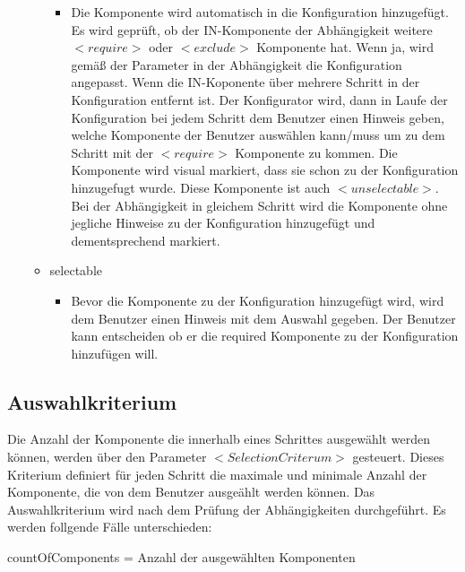 \documentclass{article}
\begin{document}
\begin{itemize}
\begin{itemize}
        \begin{itemize}
          \item Die Komponente wird automatisch in die Konfiguration hinzugef\"ugt.
          Es wird gepr\"uft, ob der IN-Komponente der Abh\"angigkeit weitere
          $<require>$ oder $<exclude>$ Komponente hat. Wenn ja, wird gem\"a\ss{} der
          Parameter in der Abh\"angigkeit die Konfiguration angepasst. Wenn die
          IN-Koponente über mehrere Schritt in der Konfiguration entfernt ist. Der
          Konfigurator wird, dann in Laufe der Konfiguration bei jedem Schritt dem
          Benutzer einen Hinweis geben, welche Komponente der Benutzer ausw\"ahlen
          kann/muss um zu dem Schritt mit der $<require>$ Komponente zu kommen. Die
          Komponente wird visual markiert, dass sie schon zu der Konfiguration
          hinzugefugt wurde. Diese Komponente ist auch $<unselectable>$. Bei der
          Abh\"angigkeit in gleichem Schritt wird die Komponente ohne jegliche
          Hinweise zu der Konfiguration hinzugef\"ugt und dementsprechend markiert.
        \end{itemize}
    
        \item selectable
    
        \begin{itemize}
            \item Bevor die Komponente zu der Konfiguration hinzugef\"ugt wird, wird
            dem Benutzer einen Hinweis mit dem Auswahl gegeben. Der Benutzer kann
            entscheiden ob er die required Komponente zu der Konfiguration
            hinzuf\"ugen will.
        \end{itemize}
    \end{itemize}
\end{itemize}

\subsection{Auswahlkriterium}

Die Anzahl der Komponente die innerhalb eines Schrittes ausgew\"ahlt werden
können, werden über den Parameter $<SelectionCriterum>$ gesteuert. Dieses
Kriterium definiert für jeden Schritt die maximale und minimale Anzahl der
Komponente, die von dem Benutzer ausge\"ahlt werden k\"onnen. Das Auswahlkriterium wird nach dem
Pr\"ufung der Abh\"angigkeiten durchgeführt. Es werden follgende F\"alle
unterschieden:

countOfComponents = Anzahl der ausgew\"ahlten Komponenten
\end{document}
